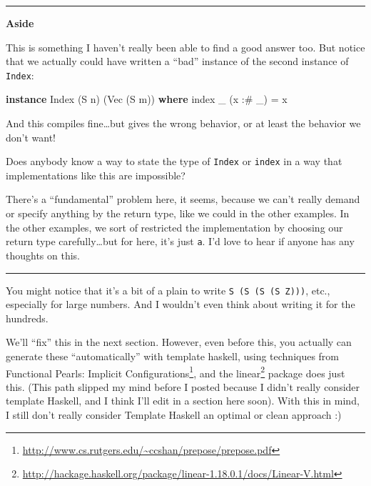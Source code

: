 \documentclass[]{article}
\newenvironment{Shaded}{}{}
\newcommand{\KeywordTok}[1]{\textcolor[rgb]{0.00,0.44,0.13}{\textbf{#1}}}
\newcommand{\DataTypeTok}[1]{\textcolor[rgb]{0.56,0.13,0.00}{#1}}
\newcommand{\FunctionTok}[1]{\textcolor[rgb]{0.02,0.16,0.49}{#1}}
\newcommand{\NormalTok}[1]{#1}
\renewcommand{\href}[2]{#2\footnote{\url{#1}}}
\begin{document}
\begin{center}\rule{0.5\linewidth}{\linethickness}\end{center}

\textbf{Aside}

This is something I haven't really been able to find a good answer too. But
notice that we actually could have written a ``bad'' instance of the second
instance of \texttt{Index}:

\begin{Shaded}
\begin{Highlighting}[]
\KeywordTok{instance} \DataTypeTok{Index}\NormalTok{ (}\DataTypeTok{S}\NormalTok{ n) (}\DataTypeTok{Vec}\NormalTok{ (}\DataTypeTok{S}\NormalTok{ m)) }\KeywordTok{where}
\NormalTok{    index _ (x }\FunctionTok{:#}\NormalTok{ _) }\FunctionTok{=}\NormalTok{ x}
\end{Highlighting}
\end{Shaded}

And this compiles fine\ldots{}but gives the wrong behavior, or at least the
behavior we don't want!

Does anybody know a way to state the type of \texttt{Index} or \texttt{index} in
a way that implementations like this are impossible?

There's a ``fundamental'' problem here, it seems, because we can't really demand
or specify anything by the return type, like we could in the other examples. In
the other examples, we sort of restricted the implementation by choosing our
return type carefully\ldots{}but for here, it's just \texttt{a}. I'd love to
hear if anyone has any thoughts on this.

\begin{center}\rule{0.5\linewidth}{\linethickness}\end{center}

You might notice that it's a bit of a plain to write
\texttt{S\ (S\ (S\ (S\ Z)))}, etc., especially for large numbers. And I wouldn't
even think about writing it for the hundreds.

We'll ``fix'' this in the next section. However, even before this, you actually
can generate these ``automatically'' with template haskell, using techniques
from \href{http://www.cs.rutgers.edu/~ccshan/prepose/prepose.pdf}{Functional
Pearls: Implicit Configurations}, and the
\href{http://hackage.haskell.org/package/linear-1.18.0.1/docs/Linear-V.html}{linear}
package does just this. (This path slipped my mind before I posted because I
didn't really consider template Haskell, and I think I'll edit in a section here
soon). With this in mind, I still don't really consider Template Haskell an
optimal or clean approach :)
\end{document}
